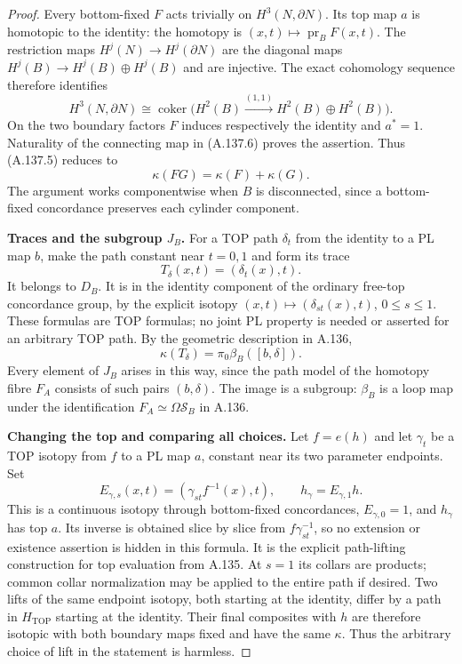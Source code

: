 \begin{proof}
Every bottom-fixed $F$ acts trivially on $H^3(N,\partial N)$.
Its top map $a$ is homotopic to the identity: the homotopy is
$(x,t)\mapsto\operatorname{pr}_B F(x,t)$. The restriction maps
$H^j(N)\to H^j(\partial N)$ are the diagonal maps
$H^j(B)\to H^j(B)\oplus H^j(B)$ and are injective. The exact
cohomology sequence therefore identifies
\[
 H^3(N,\partial N)
  \cong\operatorname{coker}
       \bigl(H^2(B)\xrightarrow{(1,1)}
                      H^2(B)\oplus H^2(B)\bigr).       \tag{A.137.6}
\]
On the two boundary factors $F$ induces respectively the identity
and $a^*=1$. Naturality of the connecting map in (A.137.6) proves
the assertion. Thus (A.137.5) reduces to
\[
                 \kappa(FG)=\kappa(F)+\kappa(G).       \tag{A.137.7}
\]
The argument works componentwise when $B$ is disconnected, since a
bottom-fixed concordance preserves each cylinder component.

\textbf{Traces and the subgroup $J_B$.}
For a TOP path $\delta_t$ from the identity to a PL map $b$, make
the path constant near $t=0,1$ and form its trace
\[
 T_\delta(x,t)=(\delta_t(x),t).                         \tag{A.137.8}
\]
It belongs to $D_B$. It is in the identity component of the ordinary
free-top concordance group, by the explicit isotopy
$(x,t)\mapsto(\delta_{s t}(x),t)$, $0\le s\le1$.
These formulas are TOP formulas; no joint PL property is needed
or asserted for an arbitrary TOP path. By the geometric description
in A.136,
\[
 \kappa(T_\delta)=\pi_0\beta_B([b,\delta]).             \tag{A.137.9}
\]
Every element of $J_B$ arises in this way, since the path model of
the homotopy fibre $F_A$ consists of such pairs $(b,\delta)$.
The image is a subgroup: $\beta_B$ is a loop map under the
identification $F_A\simeq\Omega\mathcal S_B$ in A.136.

\textbf{Changing the top and comparing all choices.}
Let $f=e(h)$ and let $\gamma_t$ be a TOP isotopy from $f$ to a PL
map $a$, constant near its two parameter endpoints. Set
\[
 E_{\gamma,s}(x,t)
       =(\gamma_{s t}f^{-1}(x),t),\qquad
 h_\gamma=E_{\gamma,1}h.                               \tag{A.137.10}
\]
This is a continuous isotopy through bottom-fixed concordances,
$E_{\gamma,0}=1$, and $h_\gamma$ has top $a$. Its inverse is
obtained slice by slice from $f\gamma_{s t}^{-1}$, so no extension
or existence assertion is hidden in this formula.
It is the explicit path-lifting construction for top evaluation
from A.135. At $s=1$ its collars are products; common collar
normalization may be applied to the entire path if desired.
Two lifts of the same endpoint isotopy, both starting at the
identity, differ by a path in $H_{\mathrm{TOP}}$ starting at the
identity. Their final composites with $h$ are therefore isotopic
with both boundary maps fixed and have the same $\kappa$. Thus the
arbitrary choice of lift in the statement is harmless.


\end{proof}
